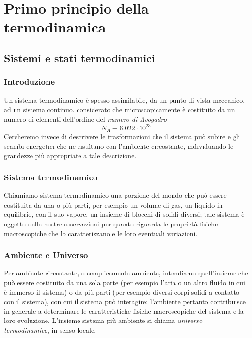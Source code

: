 \documentclass[class=book, crop=false, oneside, 12pt]{standalone}
\begin{document}
\chapter{Primo principio della termodinamica}

\section{Sistemi e stati termodinamici}

\subsection{Introduzione}

Un sistema termodinamico è spesso assimilabile, da un punto di vista meccanico, ad un sistema continuo, considerato che microscopicamente è costituito da un numero di elementi dell'ordine del \emph{numero di Avogadro}
\begin{equation*}
    N_A = 6.022 \cdot 10^{23}
\end{equation*}
Cercheremo invece di descrivere le trasformazioni che il sistema può subire e gli scambi energetici che ne risultano con l'ambiente circostante, individuando le grandezze più appropriate a tale descrizione.

\subsection{Sistema termodinamico}

Chiamiamo sistema termodinamico una porzione del mondo che può essere costituita da una o più parti, per esempio un volume di gas, un liquido in equilibrio, con il suo vapore, un insieme di blocchi di solidi diversi; tale sistema è oggetto delle nostre osservazioni per quanto riguarda le proprietà fisiche macroscopiche che lo caratterizzano e le loro eventuali variazioni. 

\subsection{Ambiente e Universo}

Per ambiente circostante, o semplicemente ambiente, intendiamo quell'insieme che può essere costituito da una sola parte (per esempio l'aria o un altro fluido in cui è immerso il sistema) o da più parti (per esempio diversi corpi solidi a contatto con il sistema), con cui il sistema può interagire: l'ambiente pertanto contribuisce in generale a determinare le caratteristiche fisiche macroscopiche del sistema e la loro evoluzione.\newline
L'insieme sistema più ambiente si chiama \emph{universo termodinamico}, in senso locale.
\end{document}
